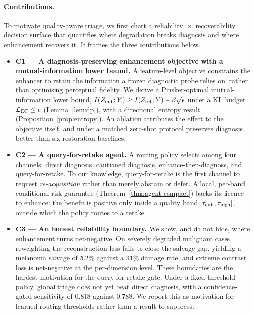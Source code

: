 \paragraph{Contributions.}
To motivate quality-aware triage, we first chart a reliability~$\times$~recoverability decision
surface that quantifies where degradation breaks diagnosis and where enhancement recovers it. It frames
the three contributions below.
\begin{itemize}
\item \textbf{C1 --- A diagnosis-preserving enhancement objective with a mutual-information lower
bound.} A feature-level objective constrains the enhancer \visienhance to retain the information a
frozen diagnostic probe relies on, rather than optimising perceptual fidelity. We derive a
Pinsker-optimal mutual-information lower bound, $I(Z_{\mathrm{enh}};Y)\geq I(Z_{\mathrm{ref}};Y)-\beta\sqrt{\epsilon}$ under
a KL budget $\mathcal{L}_{\mathrm{DP}}\leq\epsilon$ (Lemma~\ref{lem:dp}), with a directional entropy result
(Proposition~\ref{prop:entropy}). An ablation attributes the effect to the objective itself, and under
a matched zero-shot protocol \visienhance preserves diagnosis better than six restoration
baselines.
\item \textbf{C2 --- A query-for-retake agent.} A routing policy selects among four channels: direct
diagnosis, cautioned diagnosis, enhance-then-diagnose, and query-for-retake. To our knowledge,
query-for-retake is the first channel to request \emph{re-acquisition} rather than merely abstain or
defer. A local, per-band conditional risk guarantee (Theorem~\ref{thm:agent-compact}) backs its
licence to enhance: the benefit is positive only inside a quality band $[\tau_{\mathrm{enh}},\tau_{\mathrm{high}}]$, outside
which the policy routes to a retake.
\item \textbf{C3 --- An honest reliability boundary.} We show, and do not hide, where enhancement
turns net-negative. On severely degraded malignant cases, reweighting the reconstruction loss fails to
close the salvage gap, yielding a melanoma salvage of $5.2\%$ against a $31\%$ damage rate, and extreme
contrast loss is net-negative at the per-dimension level. These boundaries are the hardest motivation
for the query-for-retake gate. Under a fixed-threshold policy, global triage does not yet beat direct
diagnosis, with a confidence-gated sensitivity of $0.818$ against $0.788$. We report this as motivation
for learned routing thresholds rather than a result to suppress.
\end{itemize}
